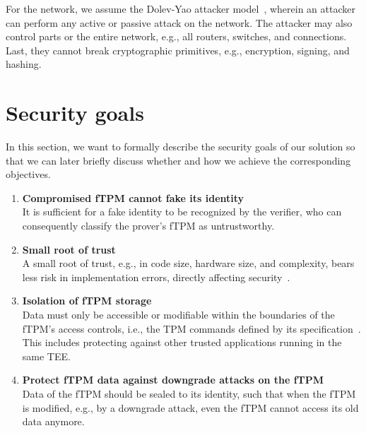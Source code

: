 For the network, we assume the Dolev-Yao attacker model~\cite{Dolev1983}, wherein an attacker can perform any active or passive attack on the network.
The attacker may also control parts or the entire network, e.g., all routers, switches, and connections.
Last, they cannot break cryptographic primitives, e.g., encryption, signing, and hashing.

\section{Security goals}\label{sec:sec-goals}

In this section, we want to formally describe the security goals of our solution so that we can later briefly discuss whether and how we achieve the corresponding objectives.

\begin{enumerate}[label=\textbf{SG-\arabic*}]
  \item{\textbf{Compromised fTPM cannot fake its identity}\\
  It is sufficient for a fake identity to be recognized by the verifier, who can consequently classify the prover's fTPM as untrustworthy.}\label{sg:1}

  \item{\textbf{Small root of trust}\\
  A small root of trust, e.g., in code size, hardware size, and complexity, bears less risk in implementation errors, directly affecting security~\cite{Singaravelu2006}.
  }\label{sg:2}
  
  \item{\textbf{Isolation of fTPM storage}\\
  Data must only be accessible or modifiable within the boundaries of the fTPM's access controls, i.e., the TPM commands defined by its specification~\cite{tpm20}.
  This includes protecting against other trusted applications running in the same \ac{TEE}\@.}\label{sg:3}
  
  \item{\textbf{Protect fTPM data against downgrade attacks on the fTPM}\\
  Data of the fTPM should be sealed to its identity, such that when the fTPM is modified, e.g., by a downgrade attack, even the fTPM cannot access its old data anymore.}\label{sg:4}

\end{enumerate}

